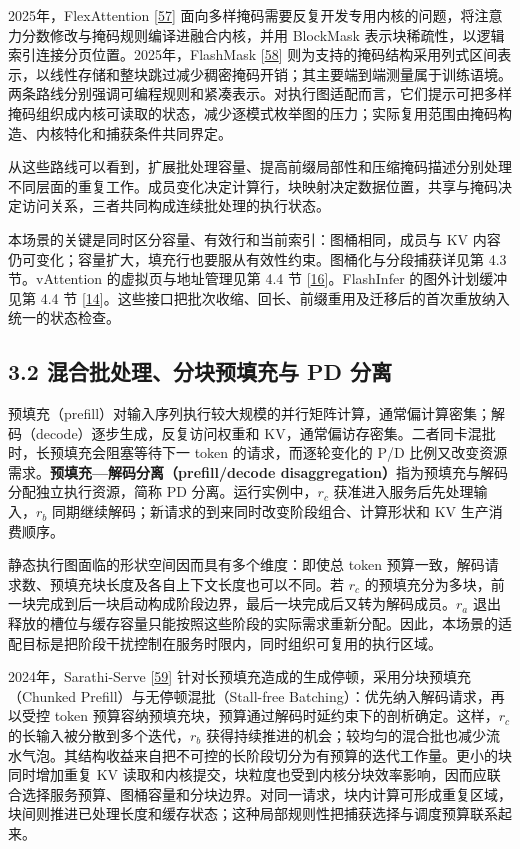 \documentclass[UTF8,10.5pt,fontset=windows]{ctexart}
\begin{document}
2025年，FlexAttention
{[}\protect\hyperlink{ref-dong2025flexattention}{57}{]}
面向多样掩码需要反复开发专用内核的问题，将注意力分数修改与掩码规则编译进融合内核，并用
BlockMask 表示块稀疏性，以逻辑索引连接分页位置。2025年，FlashMask
{[}\protect\hyperlink{ref-wang2025flashmask}{58}{]}
则为支持的掩码结构采用列式区间表示，以线性存储和整块跳过减少稠密掩码开销；其主要端到端测量属于训练语境。两条路线分别强调可编程规则和紧凑表示。对执行图适配而言，它们提示可把多样掩码组织成内核可读取的状态，减少逐模式枚举图的压力；实际复用范围由掩码构造、内核特化和捕获条件共同界定。

从这些路线可以看到，扩展批处理容量、提高前缀局部性和压缩掩码描述分别处理不同层面的重复工作。成员变化决定计算行，块映射决定数据位置，共享与掩码决定访问关系，三者共同构成连续批处理的执行状态。

本场景的关键是同时区分容量、有效行和当前索引：图桶相同，成员与 KV
内容仍可变化；容量扩大，填充行也要服从有效性约束。图桶化与分段捕获详见第
4.3 节。vAttention 的虚拟页与地址管理见第 4.4 节
{[}\protect\hyperlink{ref-prabhu2025vattention}{16}{]}。FlashInfer
的图外计划缓冲见第 4.4 节
{[}\protect\hyperlink{ref-ye2025flashinfer}{14}{]}。这些接口把批次收缩、回长、前缀重用及迁移后的首次重放纳入统一的状态检查。

\hypertarget{section-3-2}{%
\subsection{3.2 混合批处理、分块预填充与 PD 分离}\label{section-3-2}}

预填充（prefill）对输入序列执行较大规模的并行矩阵计算，通常偏计算密集；解码（decode）逐步生成，反复访问权重和
KV，通常偏访存密集。二者同卡混批时，长预填充会阻塞等待下一 token
的请求，而逐轮变化的 P/D
比例又改变资源需求。\textbf{预填充---解码分离（prefill/decode
disaggregation）}指为预填充与解码分配独立执行资源，简称 PD
分离。运行实例中，\(r_c\) 获准进入服务后先处理输入，\(r_b\)
同期继续解码；新请求的到来同时改变阶段组合、计算形状和 KV 生产消费顺序。

静态执行图面临的形状空间因而具有多个维度：即使总 token
预算一致，解码请求数、预填充块长度及各自上下文长度也可以不同。若 \(r_c\)
的预填充分为多块，前一块完成到后一块启动构成阶段边界，最后一块完成后又转为解码成员。\(r_a\)
退出释放的槽位与缓存容量只能按照这些阶段的实际需求重新分配。因此，本场景的适配目标是把阶段干扰控制在服务时限内，同时组织可复用的执行区域。

2024年，Sarathi-Serve
{[}\protect\hyperlink{ref-agrawal2024sarathi}{59}{]}
针对长预填充造成的生成停顿，采用分块预填充（Chunked
Prefill）与无停顿混批（Stall-free Batching）：优先纳入解码请求，再以受控
token 预算容纳预填充块，预算通过解码时延约束下的剖析确定。这样，\(r_c\)
的长输入被分散到多个迭代，\(r_b\)
获得持续推进的机会；较均匀的混合批也减少流水气泡。其结构收益来自把不可控的长阶段切分为有预算的迭代工作量。更小的块同时增加重复
KV
读取和内核提交，块粒度也受到内核分块效率影响，因而应联合选择服务预算、图桶容量和分块边界。对同一请求，块内计算可形成重复区域，块间则推进已处理长度和缓存状态；这种局部规则性把捕获选择与调度预算联系起来。
\end{document}

